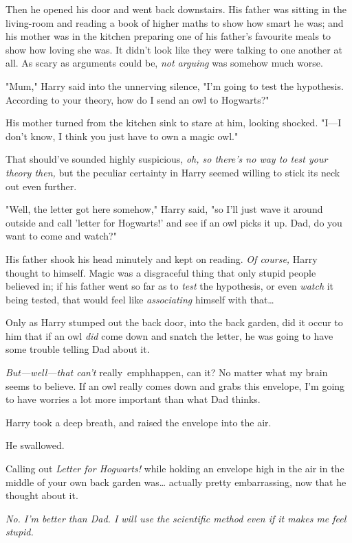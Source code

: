 Then he opened his door and went back downstairs. His father was sitting in the 
living-room and reading a book of higher maths to show how smart he was; and 
his mother was in the kitchen preparing one of his father's favourite meals to 
show how loving she was. It didn't look like they were talking to one another 
at all. As scary as arguments could be, \emph{not arguing} was somehow much 
worse.

"Mum," Harry said into the unnerving silence, "I'm going to test the 
hypothesis. According to your theory, how do I send an owl to Hogwarts?"

His mother turned from the kitchen sink to stare at him, looking shocked. 
"I---I don't know, I think you just have to own a magic owl."

That should've sounded highly suspicious, \emph{oh, so there's no way to test 
your theory then,} but the peculiar certainty in Harry seemed willing to stick 
its neck out even further.

"Well, the letter got here somehow," Harry said, "so I'll just wave it around 
outside and call 'letter for Hogwarts!' and see if an owl picks it up. Dad, do 
you want to come and watch?"

His father shook his head minutely and kept on reading. \emph{Of course,} Harry 
thought to himself. Magic was a disgraceful thing that only stupid people 
believed in; if his father went so far as to \emph{test} the hypothesis, or 
even \emph{watch} it being tested, that would feel like \emph{associating} 
himself with that{\ldots}

Only as Harry stumped out the back door, into the back garden, did it occur to 
him that if an owl \emph{did} come down and snatch the letter, he was going to 
have some trouble telling Dad about it.

\emph{But---well---that can't} really\ emph{happen, can it? No matter what my 
brain seems to believe. If an owl really comes down and grabs this envelope, 
I'm going to have worries a lot more important than what Dad thinks.}

Harry took a deep breath, and raised the envelope into the air.

He swallowed.

Calling out \emph{Letter for Hogwarts!} while holding an envelope high in the 
air in the middle of your own back garden was{\ldots} actually pretty 
embarrassing, now that he thought about it.

\emph{No. I'm better than Dad. I will use the scientific method even if it 
makes me feel stupid.}

